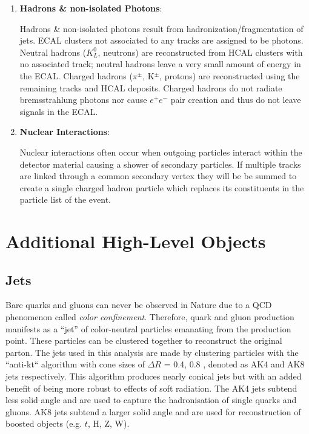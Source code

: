 \begin{enumerate}
\item \textbf{Hadrons \& non-isolated Photons}:

Hadrons \& non-isolated photons result from hadronization/fragmentation of jets. ECAL clusters not associated to any tracks are assigned to be photons. Neutral hadrons ($K^{0}_{L}$, neutrons) are reconstructed from HCAL clusters with no associated track; neutral hadrons leave a very small amount of energy in the ECAL. Charged hadrons ($\pi^{\pm}$, K$^{\pm}$, protons) are reconstructed using the remaining tracks and HCAL deposits. Charged hadrons do not radiate bremsstrahlung photons nor cause $e^{+}e^{-}$ pair creation and thus do not leave signals in the ECAL.

\item \textbf{Nuclear Interactions}:

Nuclear interactions often occur when outgoing particles interact within the detector material causing a shower of secondary particles. If multiple tracks are linked through a common secondary vertex they will be be summed to create a single charged hadron particle which replaces its constituents in the particle list of the event.

\end{enumerate}

\section{Additional High-Level Objects}

\subsection{Jets}

Bare quarks and gluons can never be observed in Nature due to a QCD phenomenon called \textit{color confinement}. Therefore, quark and gluon production manifests as a ``jet'' of color-neutral particles emanating from the production point. These particles can be clustered together to reconstruct the original parton. The jets used in this analysis are made by clustering particles with the ``anti-kt`` algorithm with cone sizes of $\Delta R$ = 0.4, 0.8 \cite{1126-6708-2008-04-063}, denoted as AK4 and AK8 jets respectively. This algorithm produces nearly conical jets but with an added benefit of being more robust to effects of soft radiation. The AK4 jets subtend less solid angle and are used to capture the hadronisation of single quarks and gluons. AK8 jets subtend a larger solid angle and are used for reconstruction of boosted objects (e.g. $t$, H, Z, W).

